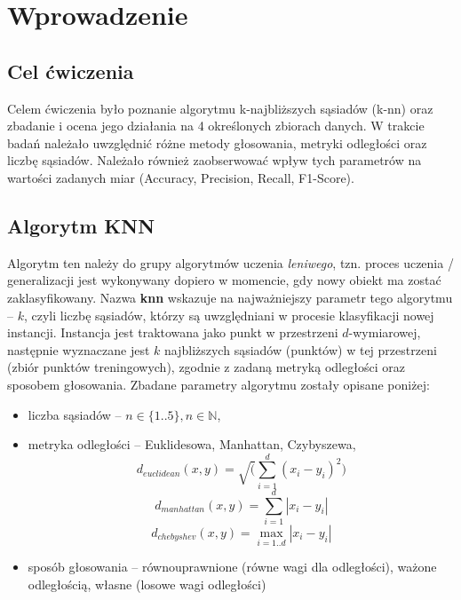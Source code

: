 \section{Wprowadzenie}
    \subsection{Cel ćwiczenia}
        Celem ćwiczenia było poznanie algorytmu k-najbliższych sąsiadów (k-nn) oraz zbadanie i ocena jego
        działania na 4 określonych zbiorach danych. W trakcie badań należało uwzględnić różne metody
        głosowania, metryki odległości oraz liczbę sąsiadów. Należało również zaobserwować wpływ tych
        parametrów na wartości zadanych miar (Accuracy, Precision, Recall, F1-Score).

    \subsection{Algorytm KNN}
        Algorytm ten należy do grupy algorytmów uczenia \textit{leniwego}, tzn. proces uczenia / generalizacji
        jest wykonywany dopiero w momencie, gdy nowy obiekt ma zostać zaklasyfikowany. Nazwa \textbf{knn} wskazuje
        na najważniejszy parametr tego algorytmu -- $k$, czyli liczbę sąsiadów, którzy są uwzględniani w procesie
        klasyfikacji nowej instancji. Instancja jest traktowana jako punkt w przestrzeni $d$-wymiarowej, następnie
        wyznaczane jest $k$ najbliższych sąsiadów (punktów) w tej przestrzeni (zbiór punktów treningowych), zgodnie
        z zadaną metryką odległości oraz sposobem głosowania. Zbadane parametry algorytmu zostały opisane poniżej:

        \begin{itemize}
            \item{liczba sąsiadów -- $n \in \{1..5\}, n \in \mathbb{N}$,}
            \item{metryka odległości -- Euklidesowa, Manhattan, Czybyszewa,}
            $$ d_{euclidean}(x, y) = \sqrt(\sum_{i=1}^d (x_i - y_i)^2)$$
            $$ d_{manhattan}(x, y) = \sum_{i=1}^d | x_i - y_i |$$
            $$ d_{chebyshev}(x, y) = \max_{i=1..d} | x_i - y_i |$$
            \item{sposób głosowania -- równouprawnione (równe wagi dla odległości), ważone odległością, własne (losowe wagi odległości)}
        \end{itemize}

